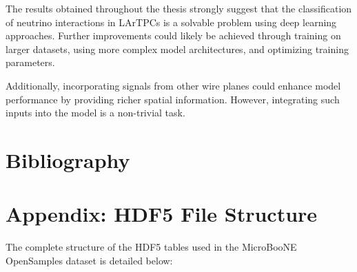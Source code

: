 \documentclass{pracalicmgr}
\begin{document}
The results obtained throughout the thesis strongly suggest that the classification of neutrino interactions in LArTPCs is a solvable problem using deep learning approaches. Further improvements could likely be achieved through training on larger datasets, using more complex model architectures, and optimizing training parameters.

Additionally, incorporating signals from other wire planes could enhance model performance by providing richer spatial information. However, integrating such inputs into the model is a non-trivial task.

\newpage

\listoffigures
\newpage

\listoftables
\newpage

\section*{Bibliography}


\newpage

\appendix

\section*{Appendix: HDF5 File Structure}
\label{app:hdf5_structure}

The complete structure of the HDF5 tables used in the MicroBooNE OpenSamples dataset is detailed below:
\end{document}
